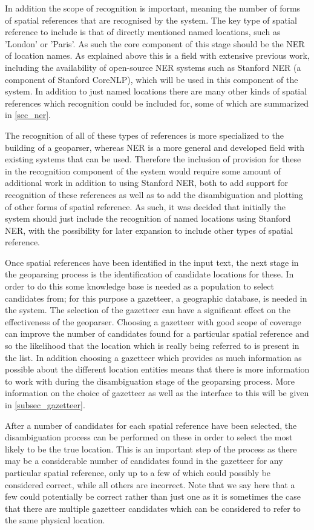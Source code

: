 \documentclass[12pt, a4paper]{report}
\begin{document}
In addition the scope of recognition is important, meaning the number of forms of spatial references that are recognised by the system. The key type of spatial reference to include is that of directly mentioned named locations, such as 'London' or 'Paris'. As such the core component of this stage should be the NER of location names. As explained above this is a field with extensive previous work, including the availability of open-source NER systems such as Stanford NER (a component of Stanford CoreNLP), which will be used in this component of the system. In addition to just named locations there are many other kinds of spatial references which recognition could be included for, some of which are summarized in \ref{sec_ner}.

The recognition of all of these types of references is more specialized to the building of a geoparser, whereas NER is a more general and developed field with existing systems that can be used. Therefore the inclusion of provision for these in the recognition component of the system would require some amount of additional work in addition to using Stanford NER, both to add support for recognition of these references as well as to add the disambiguation and plotting of other forms of spatial reference. As such, it was decided that initially the system should just include the recognition of named locations using Stanford NER, with the possibility for later expansion to include other types of spatial reference.

Once spatial references have been identified in the input text, the next stage in the geoparsing process is the identification of candidate locations for these. In order to do this some knowledge base is needed as a population to select candidates from; for this purpose a gazetteer, a geographic database, is needed in the system. The selection of the gazetteer can have a significant effect on the effectiveness of the geoparser. Choosing a gazetteer with good scope of coverage can improve the number of candidates found for a particular spatial reference and so the likelihood that the location which is really being referred to is present in the list. In addition choosing a gazetteer which provides as much information as possible about the different location entities means that there is more information to work with during the disambiguation stage of the geoparsing process. More information on the choice of gazetteer as well as the interface to this will be given in \ref{subsec_gazetteer}.

After a number of candidates for each spatial reference have been selected, the disambiguation process can be performed on these in order to select the most likely to be the true location. This is an important step of the process as there may be a considerable number of candidates found in the gazetteer for any particular spatial reference, only up to a few of which could possibly be considered correct, while all others are incorrect. Note that we say here that a few could potentially be correct rather than just one as it is sometimes the case that there are multiple gazetteer candidates which can be considered to refer to the same physical location.
\end{document}
